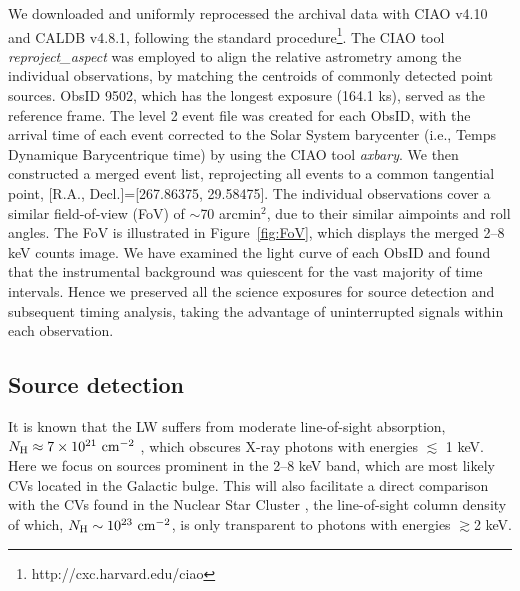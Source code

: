 \documentclass[fleqn,usenatbib]{mnras}
\begin{document}
We downloaded and uniformly reprocessed the archival data with CIAO v4.10 and CALDB v4.8.1, following the standard procedure\footnote{http://cxc.harvard.edu/ciao}.
The CIAO tool \emph{reproject\_aspect} was employed to align the relative astrometry among the individual observations, by matching the centroids of commonly detected point sources. ObsID 9502, which has the longest exposure (164.1 ks), served as the reference frame.
The level 2 event file was created for each ObsID, with the arrival time of each event corrected to the Solar System barycenter (i.e., Temps Dynamique Barycentrique time) by using the CIAO tool \emph{axbary}.
We then constructed a merged event list, reprojecting all events to a common tangential point, [R.A., Decl.]=[267.86375, 29.58475].
The individual observations cover a similar field-of-view (FoV) of $\sim$70 arcmin$^2$, due to their similar aimpoints and roll angles. The FoV is illustrated in Figure~\ref{fig:FoV}, which displays the merged 2--8 keV counts image.
We have examined the light curve of each ObsID and found that the instrumental background was quiescent for the vast majority of time intervals.
Hence we preserved all the science exposures for source detection and subsequent timing analysis, taking the advantage of uninterrupted signals within each observation.  

\subsection{Source detection}\label{subsec:detect}
It is known that the LW suffers from moderate line-of-sight absorption, $N_{\rm H} \approx 7\times10^{21}{\rm~cm^{-2}}$ \citep{2011MNRAS.414..495R}, which obscures X-ray photons with energies $\lesssim$ 1 keV.
Here we focus on sources prominent in the 2--8 keV band, which are most likely CVs located in the Galactic bulge. This will also facilitate a direct comparison with the CVs found in the Nuclear Star Cluster \citep{2018ApJS..235...26Z}, the line-of-sight column density of which, $N_{\rm H} \sim 10^{23}{\rm~cm^{-2}}$, is only transparent to photons with energies $\gtrsim$2 keV. 
\end{document}
